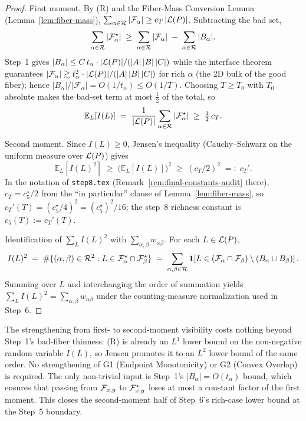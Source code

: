 \begin{proof}
First moment. By (R) and the Fiber-Mass Conversion Lemma
(Lemma~\ref{lem:fiber-mass}),
$\sum_{\alpha \in \mathcal{R}} |\mathcal{F}_\alpha| \ge c_T\,|\mathcal{L}(P)|$. Subtracting the
bad set,
\[
\sum_{\alpha \in \mathcal{R}} |\mathcal{F}_\alpha^\star|
\;\ge\; \sum_{\alpha \in \mathcal{R}} |\mathcal{F}_\alpha|
\;-\; \sum_{\alpha \in \mathcal{R}} |B_\alpha|.
\]
Step~1 gives $|B_\alpha| \le C\,t_\alpha \cdot |\mathcal{L}(P)|/(|A|\,|B|\,|C|)$ while the
interface theorem guarantees $|\mathcal{F}_\alpha| \gtrsim t_\alpha^2 \cdot
|\mathcal{L}(P)|/(|A|\,|B|\,|C|)$ for rich $\alpha$ (the 2D bulk of the good fiber);
hence $|B_\alpha|/|\mathcal{F}_\alpha| = O(1/t_\alpha) \le O(1/T)$. Choosing
$T \ge T_0$ with $T_0$ absolute makes the bad-set term at most $\tfrac12$ of
the total, so
\[
\mathbb{E}_L[I(L)]
\;=\; \frac{1}{|\mathcal{L}(P)|}\sum_{\alpha \in \mathcal{R}} |\mathcal{F}_\alpha^\star|
\;\ge\; \tfrac12\,c_T.
\]

Second moment. Since $I(L) \ge 0$, Jensen's inequality (Cauchy--Schwarz on
the uniform measure over $\mathcal{L}(P)$) gives
\[
\mathbb{E}_L[I(L)^2] \;\ge\; \big(\mathbb{E}_L[I(L)]\big)^2 \;\ge\; (c_T/2)^2
\;=:\; c_T'.
\]
In the notation of \texttt{step8.tex}
(Remark~\ref{rem:final-constants-audit} there), $c_T = c_5^\star/2$
from the ``in particular'' clause of
Lemma~\ref{lem:fiber-mass}, so
$c_T'(T) = (c_5^\star/4)^2 = (c_5^\star)^2/16$; the step~8 richness
constant is $c_5(T) := c_T'(T)$.

Identification of $\sum_L I(L)^2$ with $\sum_{\alpha,\beta} w_{\alpha\beta}$.
For each $L \in \mathcal{L}(P)$,
\[
I(L)^2
\;=\; \#\{(\alpha,\beta) \in \mathcal{R}^2 :
         L \in \mathcal{F}_\alpha^\star \cap \mathcal{F}_\beta^\star\}
\;=\; \sum_{\alpha,\beta \in \mathcal{R}}
         \mathbf{1}\!\left[L \in (\mathcal{F}_\alpha \cap \mathcal{F}_\beta) \setminus (B_\alpha \cup B_\beta)\right].
\]
Summing over $L$ and interchanging the order of summation yields
$\sum_L I(L)^2 = \sum_{\alpha,\beta} w_{\alpha\beta}$ under the counting-measure
normalization used in Step~6.
\end{proof}

\begin{remark}\label{rem:second-moment}
The strengthening from first- to second-moment visibility costs nothing beyond
Step~1's bad-fiber thinness: (R) is already an $L^1$ lower bound on the
non-negative random variable $I(L)$, so Jensen promotes it to an $L^2$ lower
bound of the same order. No strengthening of G1 (Endpoint Monotonicity) or
G2 (Convex Overlap) is required. The only non-trivial input is Step~1's
$|B_\alpha| = O(t_\alpha)$ bound, which ensures that passing from $\mathcal{F}_{x,y}$ to
$\mathcal{F}_{x,y}^\star$ loses at most a constant factor of the first moment. This closes
the second-moment half of Step~6's rich-case lower bound at the Step~5 boundary.
\end{remark}

